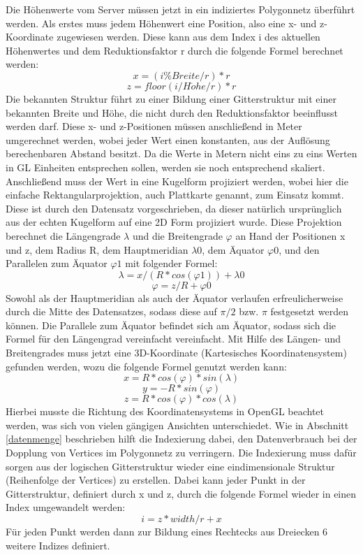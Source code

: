 Die Höhenwerte vom Server müssen jetzt in ein indiziertes Polygonnetz überführt werden. Als erstes muss jedem Höhenwert eine Position, also eine x- und z-Koordinate zugewiesen werden. Diese kann aus dem Index i des aktuellen Höhenwertes und dem Reduktionsfaktor r durch die folgende Formel berechnet werden: \[x = (i \% Breite / r) * r\] \[z = floor(i / H\ddot{o}he / r) * r\]
Die bekannten Struktur führt zu einer Bildung einer Gitterstruktur mit einer bekannten Breite und Höhe, die nicht durch den Reduktionsfaktor beeinflusst werden darf. Diese x- und z-Positionen müssen anschließend in Meter umgerechnet werden, wobei jeder Wert einen konstanten, aus der Auflösung berechenbaren Abstand besitzt. Da die Werte in Metern nicht eins zu eins Werten in GL Einheiten entsprechen sollen, werden sie noch entsprechend skaliert. Anschließend muss der Wert in eine Kugelform projiziert werden, wobei hier die einfache Rektangularprojektion, auch Plattkarte genannt, zum Einsatz kommt. Diese ist durch den Datensatz vorgeschrieben, da dieser natürlich ursprünglich aus der echten Kugelform auf eine 2D Form projiziert wurde. Diese Projektion berechnet die Längengrade $\lambda$ und die Breitengrade $\varphi$ an Hand der Positionen x und z, dem Radius R, dem Hauptmeridian $\lambda0$, dem Äquator $\varphi0$, und den Parallelen zum Äquator $\varphi1$ mit folgender Formel: \[\lambda = x / (R * cos(\varphi1)) + \lambda0\] \[\varphi = z / R + \varphi0\]
Sowohl als der Hauptmeridian als auch der Äquator verlaufen erfreulicherweise durch die Mitte des Datensatzes, sodass diese auf $\pi / 2$ bzw. $\pi$ festgesetzt werden können. Die Parallele zum Äquator befindet sich am Äquator, sodass sich die Formel für den Längengrad vereinfacht vereinfacht. Mit Hilfe des Längen- und Breitengrades muss jetzt eine 3D-Koordinate (Kartesisches Koordinatensystem) gefunden werden, wozu die folgende Formel genutzt werden kann: \[x = R * cos(\varphi) * sin(\lambda)\] \[y = -R * sin(\varphi)\] \[z = R * cos(\varphi) * cos(\lambda)\] Hierbei musste die Richtung des Koordinatensystems in OpenGL beachtet werden, was sich von vielen gängigen Ansichten unterschiedet. Wie in Abschnitt \ref{datenmenge} beschrieben hilft die Indexierung dabei, den Datenverbrauch bei der Dopplung von Vertices im Polygonnetz zu verringern. Die Indexierung muss dafür sorgen aus der logischen Gitterstruktur wieder eine eindimensionale Struktur (Reihenfolge der Vertices) zu erstellen. Dabei kann jeder Punkt in der Gitterstruktur, definiert durch x und z, durch die folgende Formel wieder in einen Index umgewandelt werden: \[i = z * width / r + x\]
Für jeden Punkt werden dann zur Bildung eines Rechtecks aus Dreiecken 6 weitere Indizes definiert.

